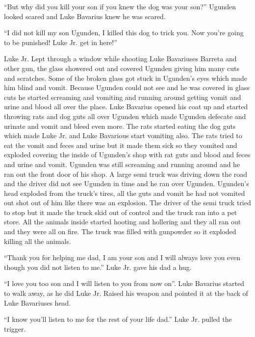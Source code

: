 ``But why did you kill your son if you knew the dog was your
son?'' Ugunden looked scared and Luke Bavarius knew he was
scared.



``I did not kill my son Ugunden, I killed this dog to trick
you. Now you're going to be punished! Luke Jr. get in
here!''



Luke Jr. Lept through a window while shooting Luke Bavariuses
Barreta and other gun, the glass showered out and covered Ugunden
giving him many cuts and scratches. Some of the broken glass got
stuck in Ugunden's eyes which made him blind and vomit. Because
Ugunden could not see and he was covered in glass cuts he started
screaming and vomiting and running around getting vomit and urine
and blood all over the place. Luke Bavarius opened his coat up and
started throwing rats and dog guts all over Ugunden which made
Ugunden defecate and urinate and vomit and bleed even more. The
rats started eating the dog guts which made Luke Jr. and Luke
Bavarious start vomiting also. The rats tried to eat the vomit and
feces and urine but it made them sick so they vomited and exploded
covering the inside of Ugunden's shop with rat guts and blood and
feces and urine and vomit. Ugunden was still screaming and running
around and he ran out the front door of his shop. A large semi
truck was driving down the road and the driver did not see Ugunden
in time and he ran over Ugunden. Ugunden's head exploded from the
truck's tires, all the guts and vomit he had not vomited out shot
out of him like there was an explosion. The driver of the semi
truck tried to stop but it made the truck skid out of control and
the truck ran into a pet store. All the animals inside started
hooting and hollering and they all ran out and they were all on
fire. The truck was filled with gunpowder so it exploded killing
all the animals.



``Thank you for helping me dad, I am your son and I will
always love you even though you did not listen to me.'' Luke
Jr. gave his dad a hug.



``I love you too son and I will listen to you from now
on''. Luke Bavarius started to walk away, as he did Luke Jr.
Raised his weapon and pointed it at the back of Luke Bavariuses
head.



``I know you'll listen to me for the rest of your life
dad.'' Luke Jr. pulled the trigger.



